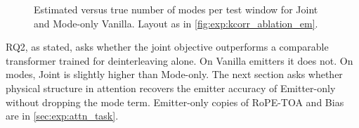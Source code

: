 \begin{figure}[tbp]
  \centering
  \caption{Estimated versus true number of modes per test window for Joint and Mode-only Vanilla. Layout as in \cref{fig:exp:kcorr_ablation_em}.}
  \label{fig:exp:kcorr_ablation_md}
\end{figure}

RQ2, as stated, asks whether the joint objective outperforms a comparable transformer trained for deinterleaving alone.
On Vanilla emitters it does not.
On modes, Joint is slightly higher than Mode-only.
The next section asks whether physical structure in attention recovers the emitter accuracy of Emitter-only without dropping the mode term.
Emitter-only copies of RoPE-TOA and Bias are in \cref{sec:exp:attn_task}.
